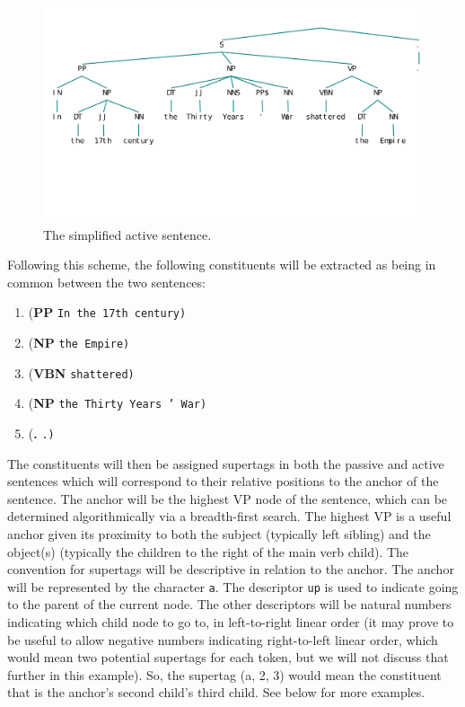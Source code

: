 \documentclass{article}
\begin{document}
\begin{figure}
\begin{center}
\includegraphics[scale=.65]{simp_pass}
\caption{The simplified active sentence.}
\end{center}
\end{figure}

Following this scheme, the following constituents will be extracted as being in common between the two sentences:

\begin{enumerate}
\item (\textbf{PP} \texttt{In the 17th century)}
\item (\textbf{NP} \texttt{the Empire)}
\item (\textbf{VBN} \texttt{shattered)}
\item (\textbf{NP} \texttt{the Thirty Years ' War)}
\item (\textbf{.} \texttt{.)}
\end{enumerate}

The constituents will then be assigned supertags in both the passive and active sentences which will correspond to their relative positions to the anchor of the sentence. The anchor will be the highest VP node of the sentence, which can be determined algorithmically via a breadth-first search. The highest VP is a useful anchor given its proximity to both the subject (typically left sibling) and the object(s) (typically the children to the right of the main verb child). The convention for supertags will be descriptive in relation to the anchor. The anchor will be represented by the character \texttt{a}. The descriptor \texttt{up} is used to indicate going to the parent of the current node. The other descriptors will be natural numbers indicating which child node to go to, in left-to-right linear order (it may prove to be useful to allow negative numbers indicating right-to-left linear order, which would mean two potential supertags for each token, but we will not discuss that further in this example). So, the supertag (a, 2, 3) would mean the constituent that is the anchor's second child's third child. See below for more examples.	
\end{document}
